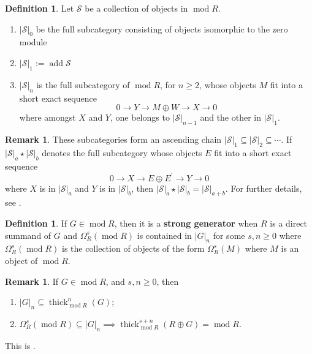 \documentclass[11pt]{amsart}
\theoremstyle{plain}
\theoremstyle{definition}
\newtheorem{definition}[theorem]{Definition}
\newtheorem{remark}[theorem]{Remark}
\numberwithin{equation}{section}
\numberwithin{theorem}{section}
\begin{document}
\begin{definition}
    Let $\mathcal{S}$ be a collection of objects in $\operatorname{mod}R$.
    \begin{enumerate}
        \item $|\mathcal{S}|_0$ be the full subcategory consisting of objects isomorphic to the zero module 
        \item $|\mathcal{S}|_1 := \operatorname{add}\mathcal{S}$
        \item $|\mathcal{S}|_n$ is the full subcategory of $\operatorname{mod}R$, for $n\geq 2$, whose objects $M$ fit into a short exact sequence
        \begin{displaymath}
            0 \to Y \to M\oplus W \to X \to 0
        \end{displaymath}
        where amongst $X$ and $Y$, one belongs to $|\mathcal{S}|_{n-1}$ and the other in $|\mathcal{S}|_1$.
    \end{enumerate}
\end{definition}

\begin{remark}
    These subcategories form an ascending chain $|\mathcal{S}|_1 \subseteq |\mathcal{S}|_2 \subseteq \cdots$. If $|\mathcal{S}|_a \star |\mathcal{S}|_b$ denotes the full subcategory whose objects $E$ fit into a short exact sequence
    \begin{displaymath}
        0 \to X \to E \oplus E^\prime \to Y \to 0
    \end{displaymath}
    where $X$ is in $|\mathcal{S}|_a$ and $Y$ is in $|\mathcal{S}|_b$, then $|\mathcal{S}|_a \star |\mathcal{S}|_b = |\mathcal{S}|_{a+b}$. For further details, see  \cite[$\S 5$]{Dao/Takahashi:2014}.
\end{remark}

\begin{definition}
    If $G\in \operatorname{mod}R$, then it is a \textbf{strong generator} when $R$ is a direct summand of $G$ and $\Omega^s_R (\operatorname{mod}R)$ is contained in $|G|_n$ for some $s,n\geq 0$ where $\Omega_R^s (\operatorname{mod}R)$ is the collection of objects of the form $\Omega^s_R (M)$ where $M$ is an object of $\operatorname{mod}R$.
\end{definition}

\begin{remark}\label{rmk:thick_categories_module_property}
    If $G\in \operatorname{mod}R$, and $s,n\geq 0$, then
    \begin{enumerate}
        \item $|G|_n \subseteq \operatorname{thick}_{\operatorname{mod}R}^n (G)$;
        \item $\Omega_R^s (\operatorname{mod}R) \subseteq |G|_n \implies \operatorname{thick}_{\operatorname{mod}R}^{s+n} (R\oplus G) = \operatorname{mod}R$.
    \end{enumerate}
    This is \cite[Proposition 4.5 \& Corollary 4.6]{Iyengar/Takahashi:2016}. 
\end{remark}
\end{document}

